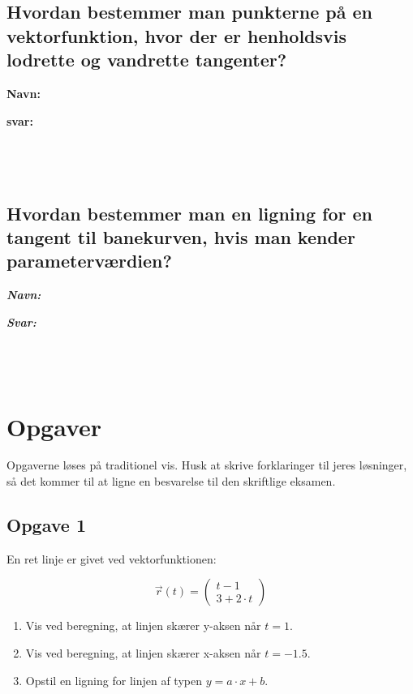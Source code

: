 \documentclass[a4paper, 12pt]{article}
\begin{document}
$$\phantom{a}$$

$$\phantom{a}$$

$$\phantom{a}$$


\subsection*{Hvordan bestemmer man punkterne på en vektorfunktion, hvor der er henholdsvis lodrette og vandrette tangenter?}
\label{sec:org0eefab4}

\textbf{Navn:}

\textbf{svar:}

$$\phantom{a}$$

$$\phantom{a}$$

$$\phantom{a}$$

\subsection*{Hvordan bestemmer man en ligning for en tangent til banekurven, hvis man kender parameterværdien?}
\label{sec:org46eb7ae}

\textbf{\emph{Navn:}}

\textbf{\emph{Svar:}}

$$\phantom{a}$$

$$\phantom{a}$$

$$\phantom{a}$$

\newpage

\section*{Opgaver}
\label{sec:orgd2b5335}

Opgaverne løses på traditionel vis. Husk at skrive forklaringer til jeres løsninger, så det kommer til at ligne en besvarelse til den skriftlige eksamen.

\subsection*{Opgave 1}
\label{sec:org6c173e6}

En ret linje er givet ved vektorfunktionen:

$$\vec{r}(t) = \begin{pmatrix} t -1 \\ 3+ 2 \cdot t\end{pmatrix}$$

\begin{enumerate}
\item Vis ved beregning, at linjen skærer y-aksen når \(t=1\).

\item Vis ved beregning, at linjen skærer x-aksen når \(t=-1.5\).

\item Opstil en ligning for linjen af typen \(y=a \cdot x + b\).
\end{enumerate}
\end{document}
